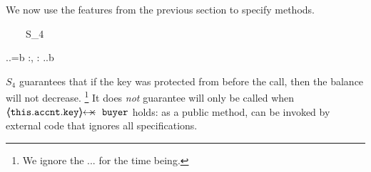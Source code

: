  \begin{example}
 We   now use the features from the previous section to specify methods. 

{\sprepostShort
		{\strut \ \ \ \ S_4} 
		{    {} \wedge {}.\prg{\myAccount}.\prg{\balance}=b
		 }
		{} {} {:, : }
		{ 
		  .\prg{\myAccount}.\prg{\balance}\geq b
		} 
		}

\noindent
$S_4$  guarantees that if the  key was protected from  before the call, then the balance will not decrease. 
\footnote{We ignore the ... for the time being.}
 It does \emph{not} guarantee  will only be called when $\protectedFrom{\prg{this}.\prg{\myAccount}.\prg{key}} {\prg{buyer}}$ holds: 
as a  public method,    can be invoked by external code that ignores all specifications.
\end{example}


